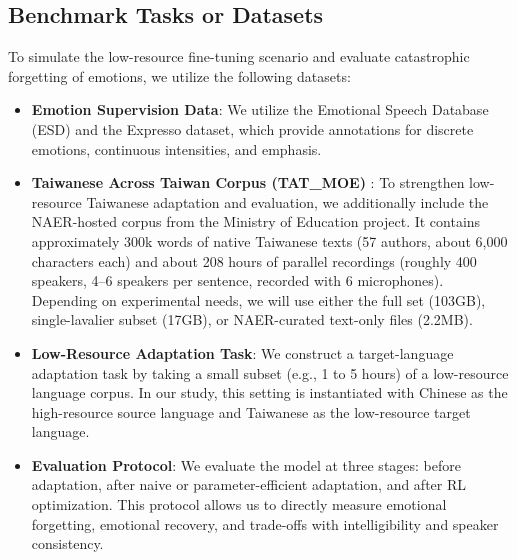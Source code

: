 \subsection{Benchmark Tasks or Datasets}
To simulate the low-resource fine-tuning scenario and evaluate catastrophic forgetting of emotions, we utilize the following datasets:
\begin{itemize}
    \item \textbf{Emotion Supervision Data}: We utilize the Emotional Speech Database (ESD) and the Expresso dataset, which provide annotations for discrete emotions, continuous intensities, and emphasis.
    \item \textbf{Taiwanese Across Taiwan Corpus (TAT\_MOE)} \citep{Liao2022TATMOE}: To strengthen low-resource Taiwanese adaptation and evaluation, we additionally include the NAER-hosted corpus from the Ministry of Education project. It contains approximately 300k words of native Taiwanese texts (57 authors, about 6,000 characters each) and about 208 hours of parallel recordings (roughly 400 speakers, 4--6 speakers per sentence, recorded with 6 microphones). Depending on experimental needs, we will use either the full set (103GB), single-lavalier subset (17GB), or NAER-curated text-only files (2.2MB).
    \item \textbf{Low-Resource Adaptation Task}: We construct a target-language adaptation task by taking a small subset (e.g., 1 to 5 hours) of a low-resource language corpus. In our study, this setting is instantiated with Chinese as the high-resource source language and Taiwanese as the low-resource target language.
    \item \textbf{Evaluation Protocol}: We evaluate the model at three stages: before adaptation, after naive or parameter-efficient adaptation, and after RL optimization. This protocol allows us to directly measure emotional forgetting, emotional recovery, and trade-offs with intelligibility and speaker consistency.
\end{itemize}
